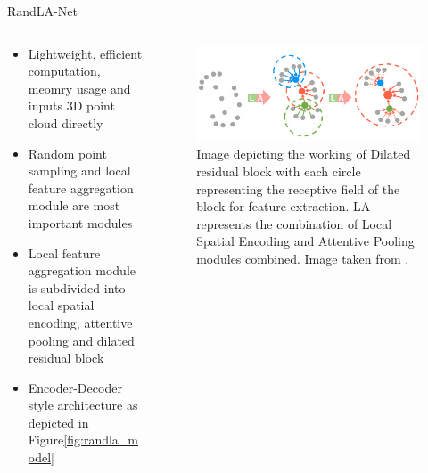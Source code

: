 \documentclass[aspectratio=169]{beamer}
\begin{document}
\begin{frame}{RandLA-Net}
    \begin{columns}
        \begin{column}{0.6\textwidth}
            \begin{itemize}
                \item Lightweight, efficient computation, meomry usage and inputs 3D point cloud directly
                \item Random point sampling and local feature aggregation module are most important modules
                \item Local feature aggregation module is subdivided into local spatial encoding, attentive pooling and dilated residual block
                \item Encoder-Decoder style architecture as depicted in Figure\ref{fig:randla_model}
            \end{itemize}
        \end{column}
        \begin{column}{0.4\textwidth}
            \begin{figure}
                \centering
                \includegraphics[scale=0.35]{images/randlanet_dires_effect.jpg}
                \caption{Image depicting the working of Dilated residual block with each circle representing the receptive
                field of the block for feature extraction. LA represents the combination of Local Spatial Encoding and
                Attentive Pooling modules combined. Image taken from \cite{Hu_2020_CVPR_Randla}.}
                \label{fig:dires_effect}
            \end{figure}
        \end{column}
    \end{columns}
    
\end{frame}
\end{document}
